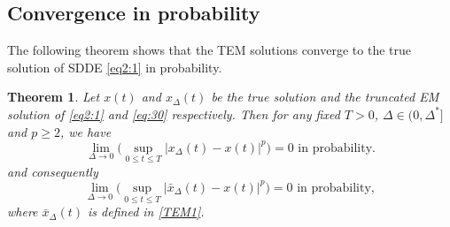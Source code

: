 \documentclass[11pt]{article}
\newtheorem{theorem}[definition]{Theorem}
\begin{document}
\subsection{Convergence in probability}
The following theorem shows that the TEM solutions converge to the true solution of SDDE \eqref{eq2:1} in probability.
\begin{theorem}\label{final}
Let  $x(t)$ and $x_{\Delta}(t)$ be the true solution and the truncated EM solution of \eqref{eq2:1} and \eqref{eq:30} respectively. Then for any fixed $T>0$, $\Delta\in (0,\Delta^*]$ and $p\ge 2$, we have
\begin{equation}\label{converge1}
\lim_{\Delta\rightarrow 0}\Big( \sup_{0\leq t \leq T}|x_{\Delta}(t)-x(t)|^p\Big)=0\text{ in probability}.
\end{equation}
and consequently 
\begin{equation}\label{converge2}
\lim_{\Delta\rightarrow 0}\Big( \sup_{0\leq t \leq T}|\bar{x}_{\Delta}(t)-x(t)|^p\Big)=0\text{ in probability},
\end{equation}
where $\bar{x}_{\Delta}(t)$ is defined in \eqref{TEM1}.
\end{theorem}
\end{document}
